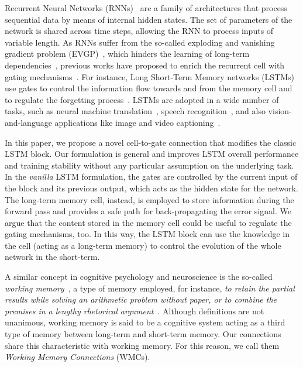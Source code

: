 Recurrent Neural Networks (RNNs)~\citep{Elman1990FindingSI,Rumelhart1986LearningRB} are a family of architectures that process sequential data by means of internal hidden states. The set of parameters of the network is shared across time steps, allowing the RNN to process inputs of variable length. 
As RNNs suffer from the so-called exploding and vanishing gradient problem (EVGP)~\citep{bengio1993problem,hochreiter1991untersuchungen}, which hinders the learning of long-term dependencies~\citep{bengio1994learning, pascanu2013difficulty}, previous works have proposed to enrich the recurrent cell with gating mechanisms~\citep{hochreiter1997long,jing2019gated}.
For instance, Long Short-Term Memory networks (LSTMs)~\citep{hochreiter1997long} use gates to control the information flow towards and from the memory cell and to regulate the forgetting process~\citep{gers2000forget}.
LSTMs are adopted in a wide number of tasks, such as neural machine translation~\citep{bahdanau2015neural,sutskever2014sequence}, speech recognition~\citep{graves2013speech}, and also vision-and-language applications like image and video captioning~\citep{vinyals2015show,xu2015show,baraldi2017hierarchical}. 

In this paper, we propose a novel cell-to-gate connection that modifies the classic LSTM block. Our formulation is general and improves LSTM overall performance and training stability without any particular assumption on the underlying task.
In the \textit{vanilla} LSTM formulation, the gates are controlled by the current input of the block and its previous output, which acts as the hidden state for the network. The long-term memory cell, instead, is employed to store information during the forward pass and provides a safe path for back-propagating the error signal. 
%
We argue that the content stored in the memory cell could be useful to regulate the gating mechanisms, too.
 In this way, the LSTM block can use the knowledge in the cell (acting as a long-term memory) to control the evolution of the whole network in the short-term.

A similar concept in cognitive psychology and neuroscience is the so-called \textit{working memory}~\citep{ericsson1995long}, a type of memory employed, for instance, \textit{to retain the partial results while solving an arithmetic problem without paper, or to combine the premises in a lengthy rhetorical argument}~\citep{hernandez2018neuroethics}. Although definitions are not unanimous, working memory is said to be a cognitive system acting as a third type of memory between long-term and short-term memory. Our connections share this characteristic with working memory. For this reason, we call them \textit{Working Memory Connections} (WMCs).

